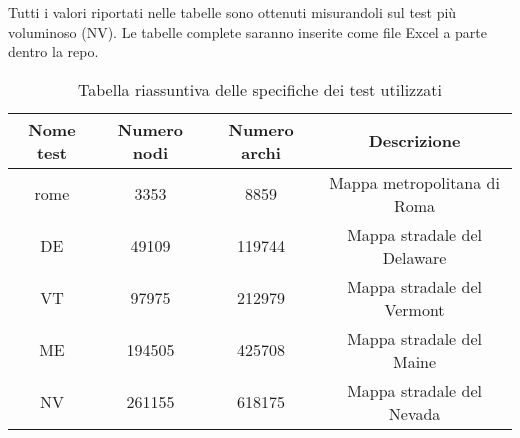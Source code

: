 \documentclass{article}
\begin{document}
	Tutti i valori riportati nelle tabelle sono ottenuti misurandoli sul test più voluminoso (NV). Le tabelle complete saranno inserite come file Excel a parte dentro la repo.
	\begin{table}[!ht]
		\centering
		\begin{tabular}{|c|c|c|c|}
			\hline
			\textbf{Nome test} & \textbf{Numero nodi} & \textbf{Numero archi} & \textbf{Descrizione} \\ \hline
			rome & 3353 & 8859 & Mappa metropolitana di Roma \\ \hline
			DE & 49109 & 119744 & Mappa stradale del Delaware \\ \hline
			VT & 97975 & 212979 & Mappa stradale del Vermont \\ \hline
			ME & 194505 & 425708 & Mappa stradale del Maine \\ \hline
			NV & 261155 & 618175 & Mappa stradale del Nevada \\ \hline
		\end{tabular}
		\label{tab:riassunto_test}
		\caption{Tabella riassuntiva delle specifiche dei test utilizzati}
	\end{table}
\end{document}
